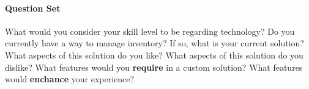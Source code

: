 \documentclass[../../../main.tex]{subfiles}
\begin{document}
\paragraph{Question Set}
\begin{outline}
    \1 What would you consider your skill level to be regarding technology?
    \1 Do you currently have a way to manage inventory?
    \2 If so, what is your current solution?
    \3 What aspects of this solution do you like?
    \3 What aspects of this solution do you dislike?
    \2 What features would you \textbf{require} in a custom solution?
    \2 What features would \textbf{enchance} your experience?
\end{outline}

\begin{comment}
CF
CF "SLT": library

what is the current system?
borrowing cards and date stamps that are manually written in for when books are due back
borrower card for who borrowed which book, stickers placed on books for categories

problems with existing solution
time consuming; cards get lost; stickers fall off
not very quick to see who borrowed what; have to look through all cards


like about the existing solution
primary aged students/children can do it (themselves)

requirements for new solution

scan a barcode / borrower ticket and instantly see what they've borrowed.

cost effective
compatible with existing hardware/software
works on ipa
ability to renew
notified when books are overdue
statistics (book numbers) by genre/author/category

enhancements for new solution
colored stickers for categories
ability to charge parents (make an invoice?)

is there a specific way you would like the system to be organised?
yes, we are a library so by preset genres and categories

do you have any questions of your own?
what's the timeframe for this being completed - March.

fake pupil: Ella (no surname)
year 6 "head librarian" age 10-**11** (y6)

problems with the current system
"so old fashioned, should be able to scan using my iPad! Then it could be pupil-led."

benefits
can see who borrowed the book I want and nag them to return it so I can read it!
when I forget which book I've borrowed the teacher can easily find which books I've lost

requirements
iPads; fast (can be done in break times - borrow/renew)




fake teacher
equipment for science lab/art room/ etc


can say helping a junior school.


\end{comment}
\end{document}
